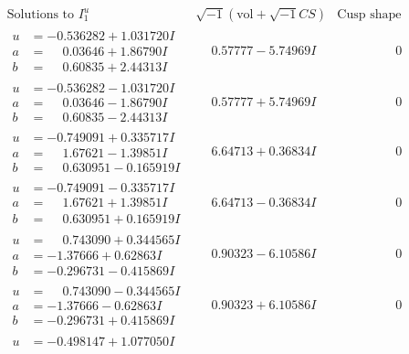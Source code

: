 \documentclass[1p]{elsarticle_modified}
\theoremstyle{definition}
\newcommand{\I}{\sqrt{-1}}
\begin{document}
$$\begin{array}{c|c|c}
\text{Solutions to }I^u_{1}& \I (\text{vol} + \sqrt{-1}CS) & \text{Cusp shape}\\
 \hline 
\begin{aligned}
u &= -0.536282 + 1.031720 I \\
a &= \phantom{-}0.03646 + 1.86790 I \\
b &= \phantom{-}0.60835 + 2.44313 I\end{aligned}
 & \phantom{-}0.57777 - 5.74969 I & \phantom{-0.000000 } 0 \\ \hline\begin{aligned}
u &= -0.536282 - 1.031720 I \\
a &= \phantom{-}0.03646 - 1.86790 I \\
b &= \phantom{-}0.60835 - 2.44313 I\end{aligned}
 & \phantom{-}0.57777 + 5.74969 I & \phantom{-0.000000 } 0 \\ \hline\begin{aligned}
u &= -0.749091 + 0.335717 I \\
a &= \phantom{-}1.67621 - 1.39851 I \\
b &= \phantom{-}0.630951 - 0.165919 I\end{aligned}
 & \phantom{-}6.64713 + 0.36834 I & \phantom{-0.000000 } 0 \\ \hline\begin{aligned}
u &= -0.749091 - 0.335717 I \\
a &= \phantom{-}1.67621 + 1.39851 I \\
b &= \phantom{-}0.630951 + 0.165919 I\end{aligned}
 & \phantom{-}6.64713 - 0.36834 I & \phantom{-0.000000 } 0 \\ \hline\begin{aligned}
u &= \phantom{-}0.743090 + 0.344565 I \\
a &= -1.37666 + 0.62863 I \\
b &= -0.296731 - 0.415869 I\end{aligned}
 & \phantom{-}0.90323 - 6.10586 I & \phantom{-0.000000 } 0 \\ \hline\begin{aligned}
u &= \phantom{-}0.743090 - 0.344565 I \\
a &= -1.37666 - 0.62863 I \\
b &= -0.296731 + 0.415869 I\end{aligned}
 & \phantom{-}0.90323 + 6.10586 I & \phantom{-0.000000 } 0 \\ \hline\begin{aligned}
u &= -0.498147 + 1.077050 I \\

\end{aligned}
\end{array}$$
\end{document}
